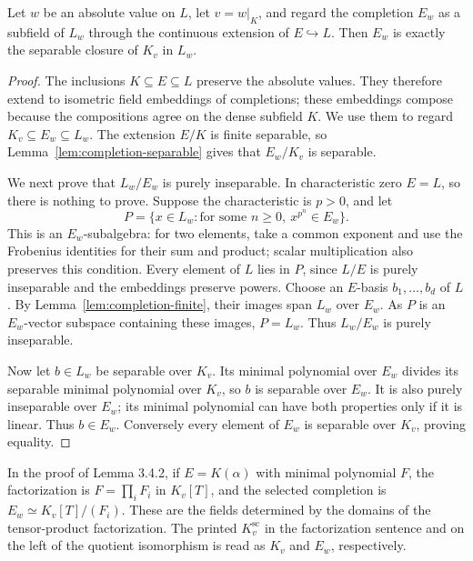 \begin{lemma}
\label{lem:completion-separable-closure}
\leanok
{}
Let $w$ be an absolute value on $L$, let $v=w|_K$, and regard the
completion $E_w$ as a subfield of $L_w$ through the continuous
extension of $E\hookrightarrow L$. Then $E_w$ is exactly the separable
closure of $K_v$ in $L_w$.
\end{lemma}
\begin{proof}
The inclusions $K\subseteq E\subseteq L$ preserve the absolute values.
They therefore extend to isometric field embeddings of completions;
these embeddings compose because the compositions agree on the dense
subfield $K$. We use them to regard $K_v\subseteq E_w\subseteq L_w$.
The extension $E/K$ is finite separable, so
Lemma~\ref{lem:completion-separable} gives that $E_w/K_v$ is separable.

We next prove that $L_w/E_w$ is purely inseparable. In characteristic
zero $E=L$, so there is nothing to prove. Suppose the characteristic
is $p>0$, and let
\[
 P=\{x\in L_w:\text{for some }n\geq0,\ x^{p^n}\in E_w\}.
\]
This is an $E_w$-subalgebra: for two elements, take a common exponent
and use the Frobenius identities for their sum and product; scalar
multiplication also preserves this condition. Every element of $L$
lies in $P$, since $L/E$ is purely inseparable and the embeddings
preserve powers. Choose an $E$-basis $b_1,\ldots,b_d$ of $L$.
By Lemma~\ref{lem:completion-finite}, their images span $L_w$ over
$E_w$. As $P$ is an $E_w$-vector subspace containing these images,
$P=L_w$. Thus $L_w/E_w$ is purely inseparable.

Now let $b\in L_w$ be separable over $K_v$. Its minimal polynomial
over $E_w$ divides its separable minimal polynomial over $K_v$,
so $b$ is separable over $E_w$. It is also purely inseparable over
$E_w$; its minimal polynomial can have both properties only if it
is linear. Thus $b\in E_w$. Conversely every element of $E_w$ is
separable over $K_v$, proving equality.
\end{proof}

\begin{remark}
\label{rem:completion-factorization-indices}
In the proof of Lemma 3.4.2, if $E=K(\alpha)$ with minimal polynomial
$F$, the factorization is $F=\prod_iF_i$ in $K_v[T]$, and the selected
completion is $E_w\simeq K_v[T]/(F_i)$. These are the fields determined
by the domains of the tensor-product factorization. The printed
$K_v^{\mathrm{sc}}$ in the factorization sentence and on the left of
the quotient isomorphism is read as $K_v$ and $E_w$, respectively.
\end{remark}

